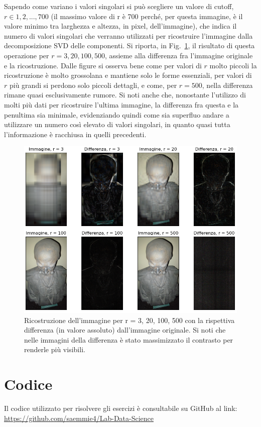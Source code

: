 \documentclass[a4paper]{article}
\renewcommand{\figurename}{Fig.}
\begin{document}
Sapendo come variano i valori singolari si può scegliere un valore di cutoff, \(r \in {1, 2, ..., 700}\) 
(il massimo valore di r è 700 perché, per questa immagine, è il valore minimo tra larghezza e altezza, in pixel, dell'immagine), che indica il numero di 
valori singolari che verranno utilizzati per ricostruire l'immagine dalla decomposizione SVD delle componenti. 
Si riporta, in \figurename~\ref{fig:es_2b_2}, il risultato di questa operazione per \(r=3,20,100,500\), 
assieme alla differenza fra l'immagine originale e la ricostruzione. Dalle figure si osserva bene come per valori di \(r\) molto piccoli la ricostruzione
è molto grossolana e mantiene solo le forme essenziali, per valori di \(r\) più grandi si perdono solo piccoli dettagli, e come, per \(r=500\),
nella differenza rimane quasi esclusivamente rumore. Si noti anche che, nonostante l'utilizzo di molti più dati per ricostruire l'ultima immagine, la 
differenza fra questa e la penultima sia minimale, evidenziando quindi come sia superfluo andare a utilizzare un numero così elevato di valori 
singolari, in quanto quasi tutta l'informazione è racchiusa in quelli precedenti.
\begin{figure}[H]
    \centering
    \includegraphics[width=.95\linewidth]{Es_2b_2.png}
    \caption{Ricostruzione dell'immagine per r = 3, 20, 100, 500 con la rispettiva differenza (in valore assoluto) dall'immagine originale. Si noti che
    nelle immagini della differenza è stato massimizzato il contrasto per renderle più visibili. \label{fig:es_2b_2}}
\end{figure}
\section*{Codice}
Il codice utilizzato per risolvere gli esercizi è consultabile su GitHub al link: \url{https://github.com/saemmie4/Lab-Data-Science}
\end{document}
